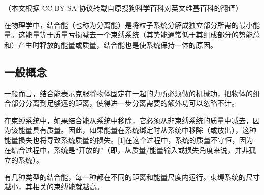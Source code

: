
（本文根据 CC-BY-SA 协议转载自原搜狗科学百科对英文维基百科的翻译）

在物理学中，结合能（也称为分离能）是将粒子系统分解成独立部分所需的最小能量。这能量等于质量亏损减去一个束缚系统（其势能通常低于其组成部分的势能总和）产生时释放的能量或质量，结合能也是使系统保持一体的原因。

\subsection{一般概念}
一般而言，结合能表示克服将物体固定在一起的力所必须做的机械功，把物体的组合部分分离到足够远的距离，使得进一步分离需要的额外功可以忽略不计。

在束缚系统中，如果结合能从系统中移除，它必须从非束缚系统的质量中减去，因为该能量具有质量。因此，如果能量在系统绑定时从系统中移除（或放出），这种能量损失也将导致系统质量的损失。[1]在这个过程中，系统的质量不守恒，因为在结合过程中，系统是“开放的”（即，从质量/能量输入或损失角度来说，并非孤立的系统）。

有几种类型的结合能，每一种都在不同的距离和能量尺度内运行。束缚系统的尺寸越小，其相关的束缚能就越高。

